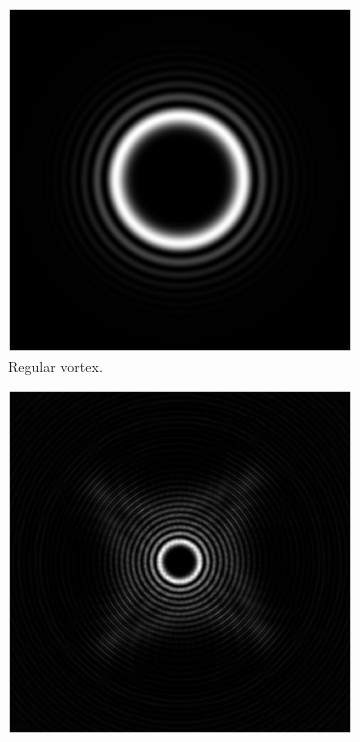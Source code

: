 
\begin{figure}[htbp]
    \centering
    \begin{subfigure}[b]{0.45\textwidth}
        \centering
        \includegraphics[width=\textwidth]{images/c02/OAM/Regular_OAM.eps}
        \caption{Regular vortex.}
    \end{subfigure}
    \hfill
    \begin{subfigure}[b]{0.45\textwidth}
        \centering
        \includegraphics[width=\textwidth]{images/c02/OAM/OAM_10_40.eps}

\end{subfigure}
\end{figure}
